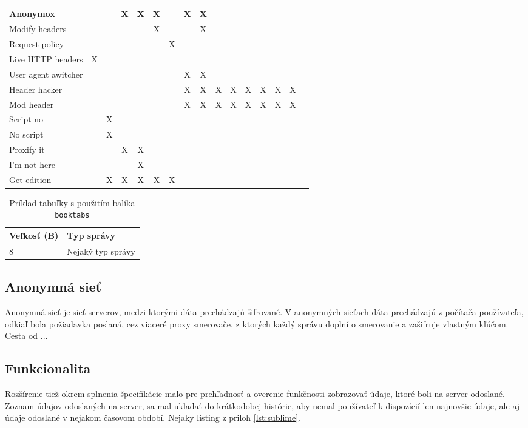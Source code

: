 \begin{table}[h]
\begin{center}
\begin{tabular}{p{4cm}|c|c|c|c|c|c|c|c|c|c|c|c|c|c|c}
Anonymox &  && X & X & X &  & X & X & & & & & & \\  \hline
Modify headers & & &  &  & X &  &  & X &  &  &  & & &  \\  \hline
Request policy & & &  &  & & X  &  &  &  &  &  & & &   \\  \hline
Live HTTP headers & X& &  &  & &  &  &  &  &  &  & & &   \\  \hline
User agent awitcher & & &  &  & &  & X & X &  &  &  & & &   \\  \hline
Header hacker & & &  &  & &  & X & X & X & X & X & X & X & X    \\  \hline
Mod header & & &  &  & &  & X & X & X & X & X & X & X & X    \\  \hline
Script no & &X &  &  & &  &  &  &  &  &  &  &  &     \\  \hline
No script & &X &  &  & &  &  &  &  &  &  &  &  &     \\  \hline
Proxify it & & &X  & X & &  &  &  &  &  &  &  &  &     \\  \hline
I'm not here & & &  & X & &  &  &  &  &  &  &  &  &     \\  \hline
Get edition & &X &X &X &X&X &  &  &  &  &  &  &  &     \\  \hline
\end{tabular}
\end{center}
\end{table}

\begin{table}[h]
    \centering
    \caption{Príklad tabuľky s použitím balíka \texttt{booktabs}}
    \begin{tabular}{@{}ll@{}} \toprule
         Veľkosť (B) & Typ správy \\ \midrule
         8 & Nejaký typ správy \\ \bottomrule
    \end{tabular}
    \label{tab:my_label}
\end{table}

\subsection{Anonymná sieť}
\noindent Anonymná sieť je sieť serverov, medzi ktorými dáta prechádzajú šifrované. V anonymných sieťach dáta prechádzajú z počítača používateľa, odkiaľ bola požiadavka poslaná, cez viaceré proxy smerovače, z ktorých každý správu doplní o smerovanie a zašifruje vlastným kľúčom. Cesta od ...


\subsection{Funkcionalita}
\noindent  Rozšírenie tiež okrem splnenia špecifikácie malo pre prehľadnosť a overenie funkčnosti zobrazovať údaje, ktoré boli na server odoslané. Zoznam údajov odoslaných na server, sa mal ukladať do krátkodobej histórie, aby nemal používateľ k dispozícií len najnovšie údaje, ale aj údaje odoslané v nejakom časovom období. Nejaky listing z priloh \ref{lst:sublime}.

